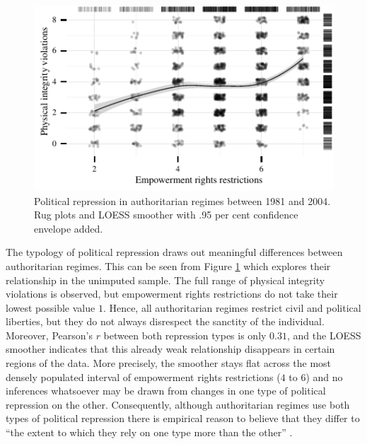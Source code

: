 \begin{figure}[!htb]
\centering
\includegraphics[width=\linewidth]{./sections/02data/scatterRepression.pdf}
\caption{Political repression in authoritarian 
regimes between 1981 and 2004. Rug plots and LOESS smoother 
with .95 per cent confidence envelope added.}
\label{fig:scatterRepression}
\end{figure}

The typology of political repression draws out meaningful
differences between authoritarian regimes. This can be seen 
from Figure \ref{fig:scatterRepression} which explores 
their relationship in the unimputed sample. The full range 
of physical integrity violations is observed, but 
empowerment rights restrictions do not take their lowest 
possible value $1$. Hence, all authoritarian regimes 
restrict civil and political liberties, but they do not 
always disrespect the sanctity of the individual. Moreover, 
Pearson's $r$ between both repression types is only  
$0.31$, and the LOESS smoother indicates that this already 
weak relationship disappears in certain regions of the data.
More precisely, the smoother stays flat across the most 
densely populated interval of empowerment rights 
restrictions ($4$ to $6$) and no inferences whatsoever may 
be drawn from changes in one type of political repression on 
the other. Consequently, although authoritarian regimes
use both types of political repression there is empirical 
reason to believe that they differ to ``the extent to
which they rely on one type more than the other'' 
\citep[336]{Frantz.2014}.

